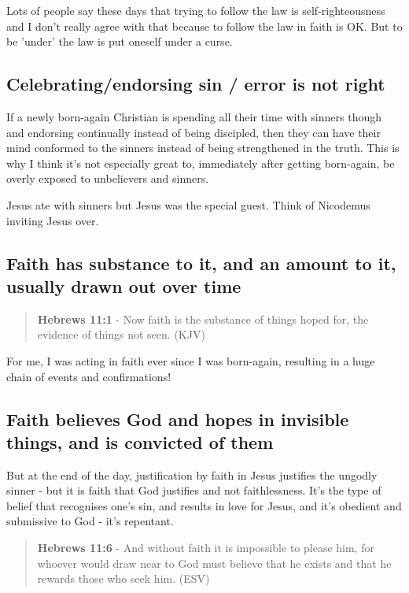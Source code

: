 \documentclass[11pt]{article}
\begin{document}
Lots of people say these days that trying to follow the law is self-righteousness and I don't really agree with that because to follow the law in faith is OK.
But to be 'under' the law is put oneself under a curse.

\subsection{Celebrating/endorsing sin / error is not right}
\label{sec:orgb24f488}

If a newly born-again Christian is spending all their time with sinners though and endorsing continually instead of being discipled, then they can
have their mind conformed to the sinners instead of being strengthened in the truth. This is why I think it's not especially great to, immediately after getting born-again,
be overly exposed to unbelievers and sinners.

Jesus ate with sinners but Jesus was the special guest. Think of Nicodemus inviting Jesus over.

\subsection{Faith has substance to it, and an amount to it, usually drawn out over time}
\label{sec:org0bd626f}
\begin{quote}
\textbf{Hebrews 11:1} - Now faith is the substance of things hoped for, the evidence of things not seen. (KJV)
\end{quote}

For me, I was acting in faith ever since I was born-again, resulting in a huge chain of events and confirmations!

\subsection{Faith believes God and hopes in invisible things, and is convicted of them}
\label{sec:org4d271ea}

But at the end of the day, justification by faith in Jesus justifies the ungodly sinner - but it is faith that God justifies and not faithlessness. It's the type of belief that recognises one's sin, and results in love for Jesus, and it's obedient and submissive to God - it's repentant.

\begin{quote}
\textbf{Hebrews 11:6} - And without faith it is impossible to please him, for whoever would draw near to God must believe that he exists and that he rewards those who seek him. (ESV)
\end{quote}
\end{document}
